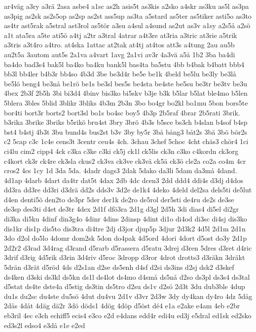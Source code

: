 {ar4väg
a3ry
a3rä
2asa
asbe4
a1sc
as2h
asis5t
as3kis
a2sko
a4skr
as3ku
as5l
as3pa
as3pig
as2sk
as2s5op
as2sp
as2st
ass5up
as3ta
a5stard
as5ter
as5tiker
asti5o
as3to
as4tr
ast5rak
a5stral
ast3rol
as5tör
a3su
a4sul
a4sund
as2ut
as3v
a1sy
a2s5å
a2sö
a1t
ata5ra
a5te
ati5ö
a4tj
a2tr
a3tral
4atrar
a4t3re
at3ria
a3tric
at3rie
a5trik
a3tris
a3t4ro
a4tro.
at4ska
1attac
at2tak
at4tj
at4tos
att3s
a4tung
2au
au5b
au2t5a
3autom
aut5s
2a1va
a4vart
1avg
2a1vi
av3r
4a3vä
a5å
1b2
3ba
ba4di
ba4do
bad3s4
bak5l
ba4ko
ba4ku
bank5l
bas4ta
ba5stu
4bb
b4bak
b4batt
bbb4
bb3l
bb4ler
b4b3r
bb4so
4b3d
3be
be3d4r
be5e
be1k
4beld
be5lu
be3ly
be3lå
be5lö
beng4
be3nå
be1rö
be1s
be3sl
bes5s
be4sta
be4ste
be5su
be3tr
be3tv
be3u
4bex
2b3f
2b5h
3bi
bi3d4
4binv
bis3ko
bi5skv
b3je
b3k
b5lar
b5lat
ble4mo
b5len
5blera
3bles
5blid
3blikr
3bliks
4b3m
2b3n
3bo
bo4gr
bo2kl
bo1mu
5bon
bors5te
bor4ti
bort3r
borts2
bort3sl
bo1s
bo4sc
boy5
4b3p
2b5raf
4brar
2b5rati
3brik.
b3rika
3brike
3briks
b5rikö
bru4st
3bry
3brö
4b3s
b5sce
bs3ch
b4slan
b4sof
b4sp
bst4
b4stj
4b3t
3bu
bund4s
bus2st
b3v
3by
by5r
3bå
bång3
båt2s
3bä
3bö
bör2s
c2
5cap
c3c
1c4e
cens3t
3centr
ceu4s
4ch.
3chau
3chef
5choc
4cht
chäs3
chör4
1ci
ci4lu
cim2
cipp4
4ck
c3ka
c3ke
c3ki
ck5j
ck1l
ck5lis
ck3n
c3ko
c4kordn
ck3org
c4kort
ck3r
ck4re
ck3sla
ckus2
ck3va
ck3ve
ck3vä
ck5ä
ck3ö
cle2a
co2a
co4m
4cr
cros2
4cs
1cy
1d
3da
5da.
4dadr
dags3
2dak
5dako
da3li
5dam
da3må
4dand.
4d1ap
4darb
4dart
da4tr
dat5t
4dax
2db
4dc
dcen3
2dd
ddd4
ddi4s
d3dj
d4dos
dd3ra
dd3re
dd3ri
d3drä
dd2s
dds3v
3d2e
de1k4
4deko
4deld
del2sa
dels5ti
de5lut
d4en
denti5ö
den2to
de3pr
5der
der1k
de2ro
de5rol
der5sti
de4ru
de2s
de3se
de3sp
des3ti
d4et
de3tr
4dex
2d1f
dfö3ra
2d1g
d3gl
2d5h
3di
dias4
di5el
di2gr
di3ka
di5ku
4dinf
din3g4o
4dinr
4dins
2dinsp
4dint
di1o
di4od
di3sc
di4sj
dis3ko
dis1kr
dis1p
dis5to
dis3tra
di4tre
2dj
d3jor
djup5p
3djur
2d3k2
4d5l
2d1m
2d1n
3do
d2ol
do5lo
4domr
dom2sk
5don
do4pak
4d5ord
4dori
4dort
d5ost
do3y
2d1p
2d2r2
d3rad
3d4rag
d3rand
d5rarb
d5rassera
d5ratu
3drej
d3ren
5dres
d3ret
d4ric
3drif
d3rig
4d5rik
d3rin
3d4riv
d5roc
3dropp
d3ror
4drot
drotts3
d3räkn
3dräkt
5drän
d3rät
d5röd
4ds
d2s1an
d2se
ds5enh
d4sf
d2si
ds3ins
d2sj
dsk2
d3skef
ds4ken
d3ski
ds3kl
ds5kn
ds1l
ds4lot
ds4mo
d4små
ds5nå
d2so
ds3pl
ds3s4
ds3tal
d5stat
ds4te
dste4a
d5stig
ds3tin
ds5tro
d2su
ds1v
d2sö
2d3t
3du
dub3ble
4dup
du1s
du2sc
du4ste
du5sö
4dut
du4vu
2d1v
d3vr
2d3w
3dy
dy4kan
dy4ro
4dz
5dåg
2dås
4dåt
4däg
dä2r
3dö
döds1
4dög
4döp
d5öst
dé4
e1a
e2ake
e4am
4eb
e2br
eb3ril
4ec
e3ch
echiff5
ecis4
e3co
e2d
e4dans
edd4r
edi4u
ed3j
e5dral
ed1sk
ed2sko
ed3s2l
edso4
e3då
e1e
e2ed
}
